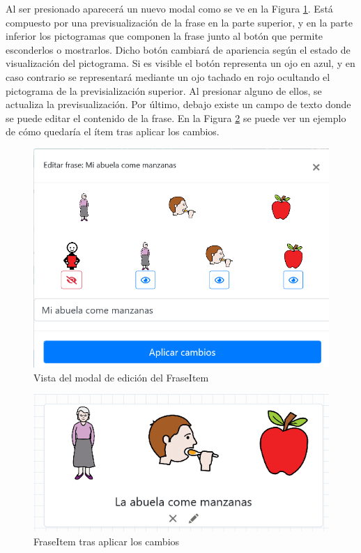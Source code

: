 Al ser presionado aparecerá un nuevo modal como se ve en la Figura \ref{fig:modaleditarfraseitem}. Está compuesto por una previsualización de la frase en la parte superior, y en la parte inferior los pictogramas que componen la frase junto al botón que permite esconderlos o mostrarlos. Dicho botón cambiará de apariencia según el estado de visualización del pictograma. Si es visible el botón representa un ojo en azul, y en caso contrario se representará mediante un ojo tachado en rojo ocultando el pictograma de la previsialización superior. Al presionar alguno de ellos, se actualiza la previsualización. Por último, debajo existe un campo de texto donde se puede editar el contenido de la frase.
En la Figura \ref{fig:fraseitemmidificada} se puede ver un ejemplo de cómo quedaría el ítem tras aplicar los cambios. 

\begin{figure}[h!]
	\centering
	\includegraphics[width=0.7\linewidth]{Imagenes/Bitmap/modalEditarFraseItem}
	\caption{Vista del modal de edición del FraseItem}
	\label{fig:modaleditarfraseitem}
\end{figure}

\begin{figure}[h!]
	\centering
	\includegraphics[width=0.7\linewidth]{Imagenes/Bitmap/fraseItemMidificada}
	\caption{FraseItem tras  aplicar los cambios}
	\label{fig:fraseitemmidificada}
\end{figure}

